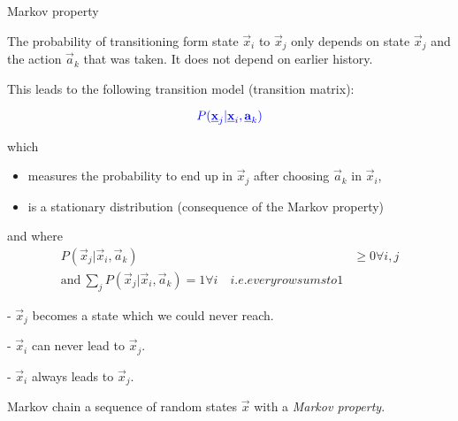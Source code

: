 \begin{frame}
\begin{block}{Markov property}

The probability of transitioning form state $\vec x_i$ to $\vec x_j$ only depends on state $\vec x_j$ and the action $\vec a_k$ that was taken. It does not depend on earlier history.
\end{block}

This leads to the following \textcolor{trans}{transition model (transition matrix)}:

\begin{equation}
\color{trans}
P(\vec x_j | \vec x_i, \vec a_k)
\end{equation}

which
\begin{itemize}
	\item measures the probability to end up in $\vec x_j$ 
		after choosing $\vec a_k$ in $\vec x_i$,
	\item is a stationary distribution (consequence of the Markov property)
\end{itemize}

and where
\begin{align}
P(\vec x_j | \vec x_i, \vec a_k) &\ge 0 \forall i,j\\
\text{and}~ \sum_j P(\vec x_j | \vec x_i, \vec a_k) = 1 \forall i \quad i.e. every row sums to 1
\end{align}


- $\vec x_j$ becomes a state which we could never reach.



- $\vec x_i$ can never lead to $\vec x_j$.


- $\vec x_i$ always leads to $\vec x_j$.

\begin{block}{Markov chain}
a sequence of random states $\vec x$ with a \emph{Markov property}.
\end{block}


\end{frame}

